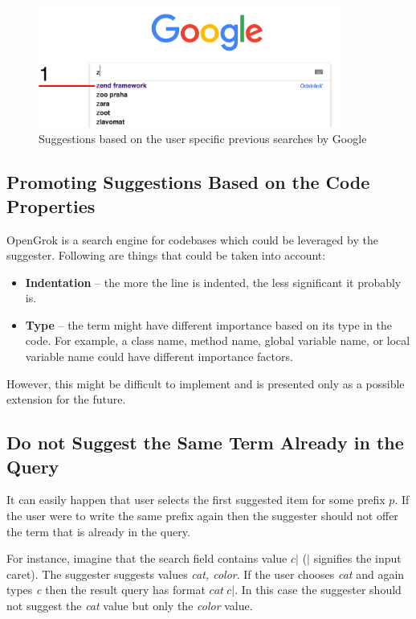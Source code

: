 \begin{figure}[htbp]
    \centering
    \includegraphics[width=100mm]{../img/google_previous.png}
    \caption{Suggestions based on the user specific previous searches by Google}
    \label{google_previous}
\end{figure}

\subsection{Promoting Suggestions Based on the Code Properties}
OpenGrok is a search engine for codebases which could be leveraged by the suggester. Following are things that could
be taken into account:
\begin{itemize}
    \item \textbf{Indentation} – the more the line is indented, the less significant it probably is.
    \item \textbf{Type} – the term might have different importance based on its type in the code. For example, a
    class name, method name, global variable name, or local variable name could have different importance factors.
\end{itemize}

However, this might be difficult to implement and is presented only as a possible extension for the future.

\subsection{Do not Suggest the Same Term Already in the Query}
It can easily happen that user selects the first suggested item for some prefix $p$. If the user were to write the same
prefix again then the suggester should not offer the term that is already in the query.

For instance, imagine that the search field contains value $c\vert$ ($\vert$ signifies the input caret). The suggester
suggests values \textit{cat, color}. If the user chooses \textit{cat} and again types \textit{c} then the result
query has format $cat\ c\vert$. In this case the suggester should not suggest the \textit{cat} value but only the \textit{color}
value.

